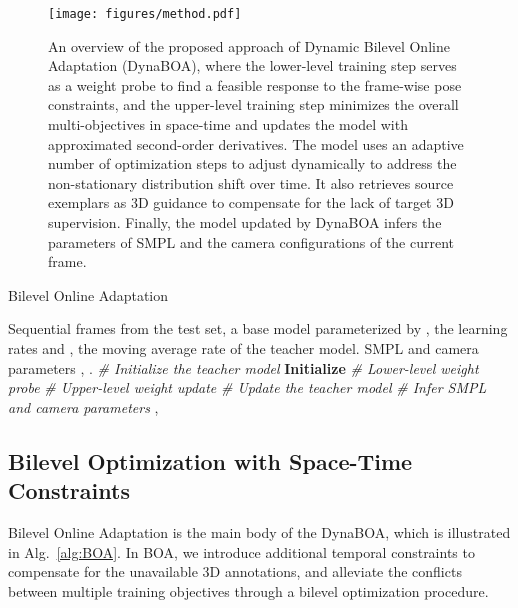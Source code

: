 \documentclass[10pt,journal,compsoc]{IEEEtran}
\let\MYoriglatexcaption\caption
\renewcommand{\caption}[2][\relax]{\MYoriglatexcaption[#2]{#2}}
\newcommand{\alg}[1]{Alg.~\ref{#1}}
\begin{document}
\begin{figure*}[t]
    \centering
    \texttt{[image: figures/method.pdf]}
    \caption{An overview of the proposed approach of Dynamic Bilevel Online Adaptation (DynaBOA), where the lower-level training step serves as a weight probe to find a feasible response to the frame-wise pose constraints, and the upper-level training step minimizes the overall multi-objectives in space-time and updates the model with approximated second-order derivatives. The model uses an adaptive number of optimization steps to adjust dynamically to address the non-stationary distribution shift over time. It also retrieves source exemplars as 3D guidance to compensate for the lack of target 3D supervision.
    Finally, the model updated by DynaBOA infers the parameters  of SMPL and the camera configurations  of the current frame. 
}
    \label{fig:framework}
\end{figure*}






\begin{algorithm}[t] 
  \caption{Bilevel Online Adaptation}  
  \label{alg:BOA}  
  \small
  \begin{algorithmic}[1]
    \Require  
    Sequential frames  from the test set, a base model  parameterized by , the learning rates  and , the moving average rate  of the teacher model.
    \Ensure  
    SMPL and camera parameters , .
    \State \textit{\# Initialize the teacher model}
    \State \textbf{Initialize}  
    \For{}
\State \textit{\# Lower-level weight probe}
        \State  \State \textit{\# Upper-level weight update}
        \State  \State \textit{\# Update the teacher model}
        \State 
\State \textit{\# Infer SMPL and camera parameters}
        \State , 
\EndFor
  \end{algorithmic}  
\end{algorithm}



\subsection{Bilevel Optimization with Space-Time Constraints}
\label{sec:boa}




Bilevel Online Adaptation is the main body of the DynaBOA, which is illustrated in \alg{alg:BOA}.
In BOA, we introduce additional temporal constraints to compensate for the unavailable 3D annotations, and alleviate the conflicts between multiple training objectives through a bilevel optimization procedure.
\end{document}
